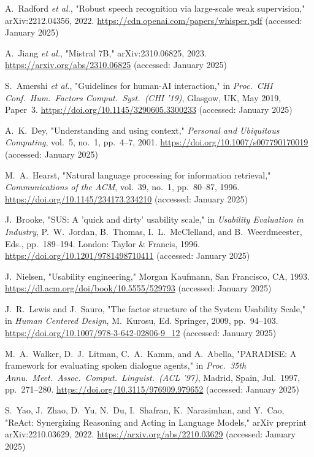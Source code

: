 \documentclass[a4paper,12pt]{article}
\begin{document}
\begin{thebibliography}{30}
 A.~Radford \textit{et al.}, "Robust speech recognition via large-scale weak supervision," arXiv:2212.04356, 2022. \url{https://cdn.openai.com/papers/whisper.pdf} (accessed: January 2025)

 A.~Jiang \textit{et al.}, "Mistral 7B," arXiv:2310.06825, 2023. \url{https://arxiv.org/abs/2310.06825} (accessed: January 2025)

 S.~Amershi \textit{et al.}, "Guidelines for human-AI interaction," in \textit{Proc.~CHI Conf.~Hum.~Factors Comput.~Syst.~(CHI '19)}, Glasgow, UK, May 2019, Paper~3. \url{https://doi.org/10.1145/3290605.3300233} (accessed: January 2025)

 A.~K.~Dey, "Understanding and using context," \textit{Personal and Ubiquitous Computing}, vol.~5, no.~1, pp.~4--7, 2001. \url{https://doi.org/10.1007/s007790170019} (accessed: January 2025)

 M.~A.~Hearst, "Natural language processing for information retrieval," \textit{Communications of the ACM}, vol.~39, no.~1, pp.~80--87, 1996. \url{https://doi.org/10.1145/234173.234210} (accessed: January 2025)

 J.~Brooke, "SUS: A 'quick and dirty' usability scale," in \textit{Usability Evaluation in Industry}, P.~W.~Jordan, B.~Thomas, I.~L.~McClelland, and B.~Weerdmeester, Eds., pp.~189--194. London: Taylor \& Francis, 1996. \url{https://doi.org/10.1201/9781498710411} (accessed: January 2025)

 J.~Nielsen, "Usability engineering," Morgan Kaufmann, San Francisco, CA, 1993. \url{https://dl.acm.org/doi/book/10.5555/529793} (accessed: January 2025)

 J.~R.~Lewis and J.~Sauro, "The factor structure of the System Usability Scale," in \textit{Human Centered Design}, M.~Kurosu, Ed. Springer, 2009, pp.~94--103. \url{https://doi.org/10.1007/978-3-642-02806-9_12} (accessed: January 2025)

 M.~A.~Walker, D.~J.~Litman, C.~A.~Kamm, and A.~Abella, "PARADISE: A framework for evaluating spoken dialogue agents," in \textit{Proc.~35th Annu.~Meet.~Assoc.~Comput.~Linguist.~(ACL '97)}, Madrid, Spain, Jul.~1997, pp.~271--280. \url{https://doi.org/10.3115/976909.979652} (accessed: January 2025)

 S.~Yao, J.~Zhao, D.~Yu, N.~Du, I.~Shafran, K.~Narasimhan, and Y.~Cao, "ReAct: Synergizing Reasoning and Acting in Language Models," arXiv preprint arXiv:2210.03629, 2022. \url{https://arxiv.org/abs/2210.03629} (accessed: January 2025)


\end{thebibliography}
\end{document}

